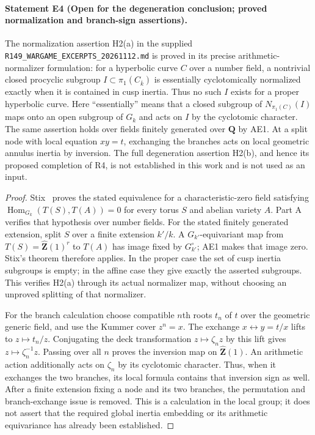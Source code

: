 \paragraph{Statement E4 (Open for the degeneration conclusion; proved
normalization and branch-sign assertions).}\label{res:E4}
The normalization assertion H2(a) in the supplied
\texttt{R149\_WARGAME\_EXCERPTS\_20261112.md} is proved in its precise
arithmetic-normalizer formulation: for a hyperbolic curve $C$ over a
number field, a nontrivial closed procyclic subgroup
$I\subset\pi_1(C_{\overline k})$ is essentially cyclotomically
normalized exactly when it is contained in cusp inertia. Thus no such
$I$ exists for a proper hyperbolic curve. Here ``essentially'' means
that a closed subgroup of $N_{\pi_1(C)}(I)$ maps onto an open subgroup
of $G_k$ and acts on $I$ by the cyclotomic character. The same assertion
holds over fields finitely generated over $\mathbf Q$ by AE1.
At a split node with local equation $xy=t$, exchanging the branches
acts on local geometric annulus inertia by inversion. The full
degeneration assertion H2(b), and hence its proposed completion of R4,
is not established in this work and is not used as an input.

\begin{proof}
Stix~\cite[Theorem 20 and \S5.2]{B_Stix2008} proves the stated
equivalence for a characteristic-zero field satisfying
$\operatorname{Hom}_{G_k}(T(S),T(A))=0$ for every torus $S$ and
abelian variety $A$. Part A verifies that hypothesis over number
fields. For the stated finitely generated extension, split $S$ over a
finite extension $k'/k$. A $G_{k'}$-equivariant map from
$T(S)=\widehat{\mathbf Z}(1)^r$ to $T(A)$ has image fixed by
$G_{k'}^\circ$; AE1 makes that image zero. Stix's theorem therefore
applies. In the proper case the set of cusp inertia subgroups is
empty; in the affine case they give exactly the asserted subgroups.
This verifies H2(a) through its actual normalizer map, without choosing
an unproved splitting of that normalizer.

For the branch calculation choose compatible $n$th roots $t_n$ of
$t$ over the geometric generic field, and use the Kummer cover
$z^n=x$. The exchange $x\leftrightarrow y=t/x$ lifts to
$z\mapsto t_n/z$. Conjugating the deck transformation
$z\mapsto\zeta_n z$ by this lift gives
$z\mapsto\zeta_n^{-1}z$. Passing over all $n$ proves the inversion
map on $\widehat{\mathbf Z}(1)$. An arithmetic action additionally
acts on $\zeta_n$ by its cyclotomic character. Thus, when it exchanges
the two branches, its local formula contains that inversion sign as
well. After a finite extension fixing a node and its two branches,
the permutation and branch-exchange issue is removed. This is a
calculation in the local group; it does not assert that the required
global inertia embedding or its arithmetic equivariance has already
been established.
\end{proof}

